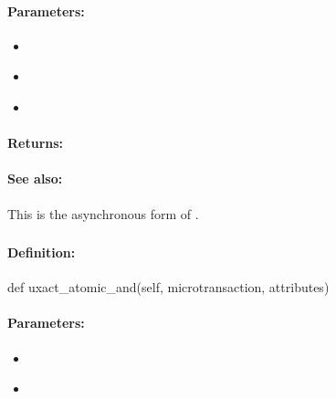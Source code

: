 \paragraph{Parameters:}
\begin{itemize}[noitemsep]
\item {}\\

\item {}\\

\item {}\\

\end{itemize}

\paragraph{Returns:}


\paragraph{See also:}  This is the asynchronous form of .

\pagebreak
\subsubsection{}
\label{api:python:uxact_atomic_and}


\paragraph{Definition:}
\begin{pythoncode}
def uxact_atomic_and(self, microtransaction, attributes)
\end{pythoncode}

\paragraph{Parameters:}
\begin{itemize}[noitemsep]
\item {}\\

\item {}\\

\end{itemize}

